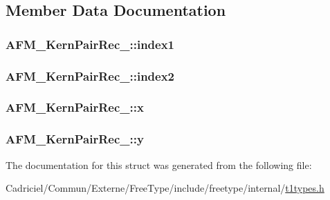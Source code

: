 \subsection{Member Data Documentation}
\hypertarget{struct_a_f_m___kern_pair_rec___a732bca56dd4a070b1d887ada1637e810}{
\subsubsection[{index1}]{ A\-F\-M\-\_\-\-Kern\-Pair\-Rec\-\_\-\-::index1}}\label{struct_a_f_m___kern_pair_rec___a732bca56dd4a070b1d887ada1637e810}
\hypertarget{struct_a_f_m___kern_pair_rec___aee548123779323c255180112c7f5b831}{
\subsubsection[{index2}]{ A\-F\-M\-\_\-\-Kern\-Pair\-Rec\-\_\-\-::index2}}\label{struct_a_f_m___kern_pair_rec___aee548123779323c255180112c7f5b831}
\hypertarget{struct_a_f_m___kern_pair_rec___a4b7f90a0e17ed89353fec14ddb29fa12}{
\subsubsection[{x}]{ A\-F\-M\-\_\-\-Kern\-Pair\-Rec\-\_\-\-::x}}\label{struct_a_f_m___kern_pair_rec___a4b7f90a0e17ed89353fec14ddb29fa12}
\hypertarget{struct_a_f_m___kern_pair_rec___aa177aa612e79701261eba72c76ea3f08}{
\subsubsection[{y}]{ A\-F\-M\-\_\-\-Kern\-Pair\-Rec\-\_\-\-::y}}\label{struct_a_f_m___kern_pair_rec___aa177aa612e79701261eba72c76ea3f08}


The documentation for this struct was generated from the following file\-:\begin{DoxyCompactItemize}
\item 
Cadriciel/\-Commun/\-Externe/\-Free\-Type/include/freetype/internal/\hyperlink{t1types_8h}{t1types.\-h}\end{DoxyCompactItemize}
